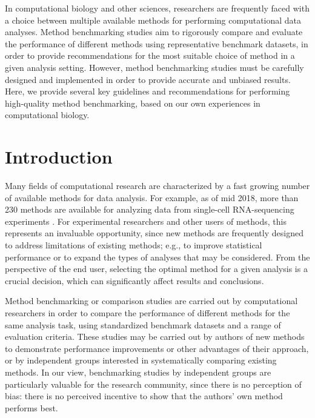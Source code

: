 \documentclass[12pt, a4paper]{article}
\begin{document}
In computational biology and other sciences, researchers are frequently faced with a choice between multiple available methods for performing computational data analyses. Method benchmarking studies aim to rigorously compare and evaluate the performance of different methods using representative benchmark datasets, in order to provide recommendations for the most suitable choice of method in a given analysis setting. However, method benchmarking studies must be carefully designed and implemented in order to provide accurate and unbiased results. Here, we provide several key guidelines and recommendations for performing high-quality method benchmarking, based on our own experiences in computational biology.




\section*{Introduction}

Many fields of computational research are characterized by a fast growing number of available methods for data analysis. For example, as of mid 2018, more than 230 methods are available for analyzing data from single-cell RNA-sequencing experiments \citep{Zappia2018}. For experimental researchers and other users of methods, this represents an invaluable opportunity, since new methods are frequently designed to address limitations of existing methods; e.g., to improve statistical performance or to expand the types of analyses that may be considered. From the perspective of the end user, selecting the optimal method for a given analysis is a crucial decision, which can significantly affect results and conclusions.

Method benchmarking or comparison studies are carried out by computational researchers in order to compare the performance of different methods for the same analysis task, using standardized benchmark datasets and a range of evaluation criteria. These studies may be carried out by authors of new methods to demonstrate performance improvements or other advantages of their approach, or by independent groups interested in systematically comparing existing methods. In our view, benchmarking studies by independent groups are particularly valuable for the research community, since there is no perception of bias: there is no perceived incentive to show that the authors' own method performs best.
\end{document}
